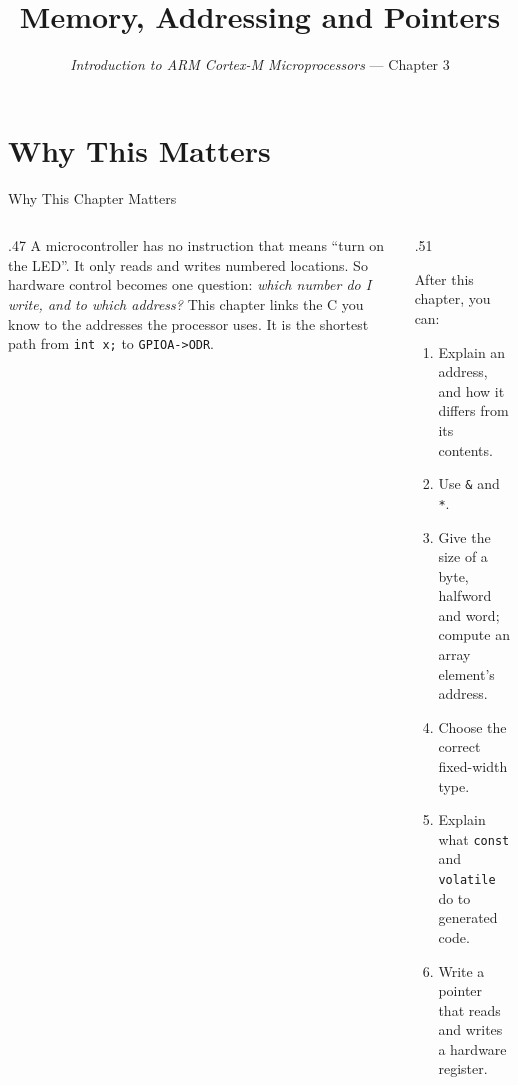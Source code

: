 \documentclass[9pt,aspectratio=169,xcolor=table]{beamer}
\title{Memory, Addressing and Pointers}
\subtitle{\emph{Introduction to ARM Cortex-M Microprocessors} --- Chapter 3}
\begin{document}
\titlepage

\section{Why This Matters}

\begin{frame}{Why This Chapter Matters}
    \begin{columns}[T]
    \begin{column}{.47\textwidth}
        {\normalsize A microcontroller has no instruction that means ``turn on the LED''. It only reads and writes numbered locations. So hardware control becomes one question: \emph{which number do I write, and to which address?} This chapter links the C you know to the addresses the processor uses. It is the shortest path from \texttt{int x;} to \texttt{GPIOA->ODR}.}
    \end{column}
    \begin{column}{.51\textwidth}
        \begin{block}{After this chapter, you can:}
        {\small
        \begin{enumerate}\itemsep2pt
            \item Explain an address, and how it differs from its contents.
            \item Use \texttt{\&} and \texttt{*}.
            \item Give the size of a byte, halfword and word; compute an array element's address.
            \item Choose the correct fixed-width type.
            \item Explain what \texttt{const} and \texttt{volatile} do to generated code.
            \item Write a pointer that reads and writes a hardware register.
        \end{enumerate}}
        \end{block}
    \end{column}
    \end{columns}
\end{frame}
\end{document}
